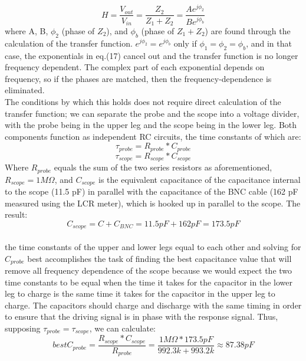 \documentclass{article}
\begin{document}
    \begin{equation}
        H = \frac{V_{out}}{V_{in}} = \frac{Z_2}{Z_1 + Z_2} = \frac{Ae^{j\phi_2}}{Be^{j\phi_b}}
    \end{equation}
    where A, B, $\phi_2$ (phase of $Z_2$), and $\phi_b$ (phase of $Z_1 + Z_2$) are found through the calculation of the transfer function. $e^{j\phi_2} = e^{j\phi_b}$ only if $\phi_1 = \phi_2 = \phi_b$, and in that case, the exponentials in eq.(17) cancel out and the transfer function is no longer frequency dependent. The complex part of each exponential depends on frequency, so if the phases are matched, then the frequency-dependence is eliminated. \\\indent The conditions by which this holds does not require direct calculation of the transfer function; we can separate the probe and the scope into a voltage divider, with the probe being in the upper leg and the scope being in the lower leg. Both components function as independent RC circuits, the time constants of which are:
    \begin{equation}
        \tau_{probe} = R_{probe}*C_{probe}
    \end{equation}
    \begin{equation}
        \tau_{scope} = R_{scope}*C_{scope}
    \end{equation}
    Where $R_{probe}$ equals the sum of the two series resistors as aforementioned, $R_{scope} = 1M\Omega$, and $C_{scope}$ is the equivalent capacitance of the capacitance internal to the scope (11.5 pF) in parallel with the capacitance of the BNC cable (162 pF measured using the LCR meter), which is hooked up in parallel to the scope. The result:
    \begin{equation}
        C_{scope} = C + C_{BNC} = 11.5pF + 162 pF = 173.5 pF
    \end{equation}
    \\\indent the time constants of the upper and lower legs equal to each other and solving for $C_{probe}$ best accomplishes the task of finding the best capacitance value that will remove all frequency dependence of the scope because we would expect the two time constants to be equal when the time it takes for the capacitor in the lower leg to charge is the same time it takes for the capacitor in the upper leg to charge. The capacitors should charge and discharge with the same timing in order to ensure that the driving signal is in phase with the response signal. Thus, supposing $\tau_{probe} = \tau_{scope}$, we can calculate:
    \begin{equation}
        best C_{probe} = \frac{R_{scope}*C_{scope}}{R_{probe}} = \frac{1 M\Omega*173.5 pF}{992.3k + 993.2k} \approx 87.38 pF
    \end{equation}
\end{document}
